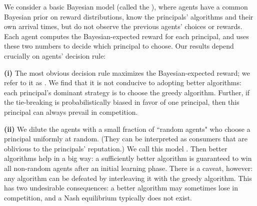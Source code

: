 

We consider a basic Bayesian model (called the \emph{\TheoryModel}), where agents have a common Bayesian prior on reward distributions, know the principals' algorithms and their own arrival times, but do not observe the previous agents' choices or rewards. Each agent computes the Bayesian-expected reward for each principal, and uses these two numbers to decide which principal to choose.
Our results depend crucially on agents' decision rule:

\textbf{(i)} The most obvious decision rule maximizes the Bayesian-expected reward; we refer to it as \HardMax. We find that it is not conducive to adopting better algorithms: each principal's dominant strategy is to choose the greedy algorithm. Further,
if the tie-breaking is probabilistically biased in favor of one principal, then this principal can always prevail in competition.

\textbf{(ii)} We dilute the \HardMax agents with a small fraction of ``random agents" who choose a principal uniformly at random.
(They can be interpreted as consumers that are oblivious to the principals' reputation.) We call this model \HardMaxRandom. Then better algorithms help in a big way: a sufficiently better algorithm is guaranteed to win all non-random agents after an initial learning phase. There is a caveat, however: any algorithm can be defeated by interleaving it with the greedy algorithm. This has two undesirable consequences: a better algorithm may sometimes lose in competition, and a Nash equilibrium typically does not exist.


